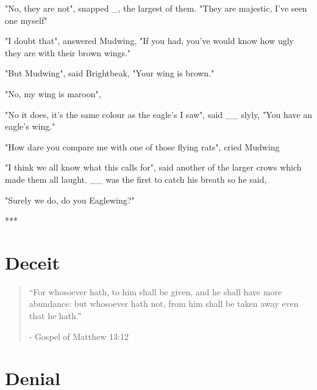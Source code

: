 \documentclass[smalldemyvopaper,11pt,twoside,onecolumn,openright,extrafontsizes]{memoir}
\begin{document}
"No, they are not", snapped _, the largest of them. "They are majestic, I've seen one myself"

"I doubt that", answered Mudwing, "If you had, you've would know how ugly they are with their brown wings."

"But Mudwing", said Brightbeak, "Your wing is brown."

"No, my wing is maroon", 

"No it does, it's the same colour as the eagle's I saw", said __ slyly, "You have an eagle's wing."

"How dare you compare me with one of those flying rats", cried Mudwing

"I think we all know what this calls for", said another of the larger crows which made them all laught. __ was the first to catch his breath so he said,  

"Surely we do, do you Eaglewing?"

***



\chapter{Deceit}


\vspace{-1.3cm}
\begin{localsize}{10}
	\begin{quote}
		“For whosoever hath, to him shall be given, and he shall have more abundance: but whosoever hath not, from him shall be taken away even that he hath.”
		\begin{flushright}- Gospel of Matthew 13:12 \end{flushright}
	\end{quote} 
\end{localsize}
\vspace{1cm}


\chapter{Denial}
\end{document}
